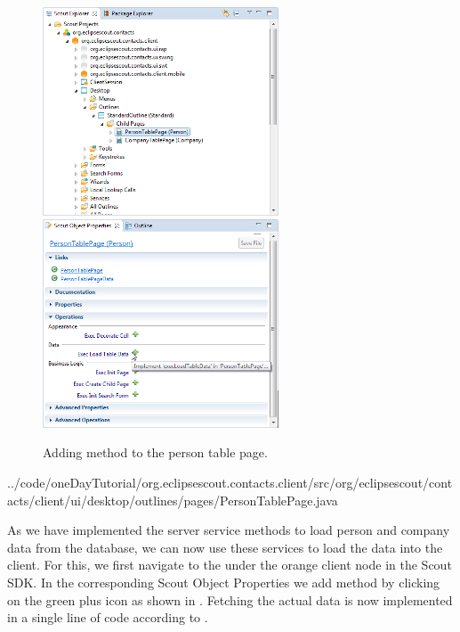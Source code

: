 \documentclass[a4paper,10pt,twoside]{book}
\begin{document}
\begin{figure}
\includegraphics[width=7cm]{implement_execloadtabledata_explorer.png} \hspace{5mm}
\includegraphics[width=7cm]{implement_execloadtabledata_properties.png}
\caption{Adding method  to the person table page.}
\end{figure}


{../code/oneDayTutorial/org.eclipsescout.contacts.client/src/org/eclipsescout/contacts/client/ui/desktop/outlines/pages/PersonTablePage.java}

As we have implemented the server service methods to load person and company data from the database, we can now use these services to load the data into the client. 
For this, we first navigate to the  under the orange client node in the Scout SDK.
In the corresponding Scout Object Properties we add method  by clicking on the green plus icon as shown in . 
Fetching the actual data is now implemented in a single line of code according to . 
\end{document}
